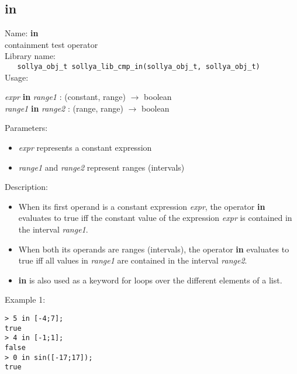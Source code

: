 \subsection{in}
\label{labin}
\noindent Name: \textbf{in}\\
\phantom{aaa}containment test operator\\[0.2cm]
\noindent Library name:\\
\verb|   sollya_obj_t sollya_lib_cmp_in(sollya_obj_t, sollya_obj_t)|\\[0.2cm]
\noindent Usage: 
\begin{center}
\emph{expr} \textbf{in} \emph{range1} : (\textsf{constant}, \textsf{range}) $\rightarrow$ \textsf{boolean}\\
\emph{range1} \textbf{in} \emph{range2} : (\textsf{range}, \textsf{range}) $\rightarrow$ \textsf{boolean}\\
\end{center}
Parameters: 
\begin{itemize}
\item \emph{expr} represents a constant expression
\item \emph{range1} and \emph{range2} represent ranges (intervals)
\end{itemize}
\noindent Description: \begin{itemize}

\item When its first operand is a constant expression \emph{expr},
   the operator \textbf{in} evaluates to true iff the constant value
   of the expression \emph{expr} is contained in the interval \emph{range1}.

\item When both its operands are ranges (intervals), 
   the operator \textbf{in} evaluates to true iff all values
   in \emph{range1} are contained in the interval \emph{range2}.

\item \textbf{in} is also used as a keyword for loops over the different
   elements of a list.
\end{itemize}
\noindent Example 1: 
\begin{center}\begin{minipage}{15cm}\begin{Verbatim}[frame=single,commandchars=\\\|\~]
> 5 in [-4;7];
true
> 4 in [-1;1];
false
> 0 in sin([-17;17]);
true
\end{Verbatim}
\end{minipage}\end{center}
